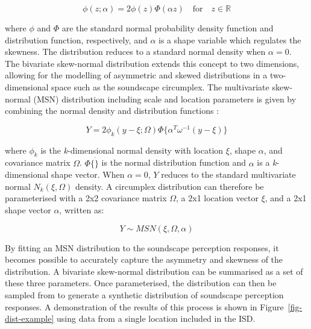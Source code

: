 \documentclass[
  authoryear,
  preprint,
  3p]{elsarticle}
\begin{document}
\[
\phi(z; \alpha) = 2 \phi(z) \Phi(\alpha z) \quad \text{for} \quad z \in \mathbb{R}
\]

where \(\phi\) and \(\Phi\) are the standard normal probability density
function and distribution function, respectively, and \(\alpha\) is a
shape variable which regulates the skewness. The distribution reduces to
a standard normal density when \(\alpha = 0\). The bivariate skew-normal
distribution extends this concept to two dimensions, allowing for the
modelling of asymmetric and skewed distributions in a two-dimensional
space such as the soundscape circumplex. The multivariate skew-normal
(MSN) distribution including scale and location parameters is given by
combining the normal density and distribution functions
\citep{Azzalini1999Statistical}:

\[
Y = 2 \phi_k (y-\xi; \Omega) \Phi\{\alpha^T\omega^{-1}(y-\xi)\} 
\]

where \(\phi_k\) is the \emph{k}-dimensional normal density with
location \(\xi\), shape \(\alpha\), and covariance matrix \(\Omega\).
\(\Phi \{ \dot \}\) is the normal distribution function and \(\alpha\)
is a \emph{k}-dimensional shape vector. When \(\alpha = 0\), \(Y\)
reduces to the standard multivariate normal \(N_k(\xi, \Omega)\)
density. A circumplex distribution can therefore be parameterised with a
2x2 covariance matrix \(\Omega\), a 2x1 location vector \(\xi\), and a
2x1 shape vector \(\alpha\), written as:

\[
Y \sim MSN (\xi, \Omega, \alpha)
\]

By fitting an MSN distribution to the soundscape perception responses,
it becomes possible to accurately capture the asymmetry and skewness of
the distribution. A bivariate skew-normal distribution can be summarised
as a set of these three parameters. Once parameterised, the distribution
can then be sampled from to generate a synthetic distribution of
soundscape perception responses. A demonstration of the results of this
process is shown in Figure~\ref{fig-dist-example} using data from a
single location included in the ISD.
\end{document}
